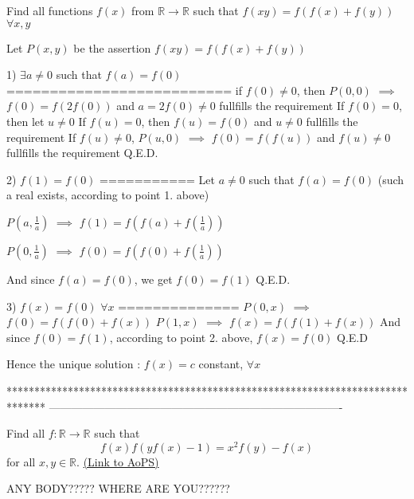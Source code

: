 \begin{solution}
	\begin{tcolorbox}Find all functions $ f(x)$ from $ \mathbb R\to\mathbb R$ such that $ f(xy)=f(f(x)+f(y))$ $ \forall x,y$\end{tcolorbox}

Let $ P(x,y)$ be the assertion $ f(xy)=f(f(x)+f(y))$

1) $ \exists a\ne 0$ such that $ f(a)=f(0)$
==========================
if $ f(0)\ne 0$, then $ P(0,0)$ $ \implies$ $ f(0)=f(2f(0))$ and $ a=2f(0)\ne 0$ fullfills the requirement
If $ f(0)=0$, then let $ u\ne 0$
If $ f(u)=0$, then $ f(u)=f(0)$ and $ u\ne 0$ fullfills the requirement
If $ f(u)\ne 0$, $ P(u,0)$ $ \implies$ $ f(0)=f(f(u))$ and $ f(u)\ne 0$ fullfills the requirement
Q.E.D.

2) $ f(1)=f(0)$
===========
Let $ a\ne 0$ such that $ f(a)=f(0)$ (such a real exists, according to point 1. above)

$ P(a,\frac 1a)$ $ \implies$ $ f(1)=f(f(a)+f(\frac 1a))$

$ P(0,\frac 1a)$ $ \implies$ $ f(0)=f(f(0)+f(\frac 1a))$

And since $ f(a)=f(0)$, we get $ f(0)=f(1)$
Q.E.D.

3) $ f(x)=f(0)$ $ \forall x$
==============
$ P(0,x)$ $ \implies$ $ f(0)=f(f(0)+f(x))$
$ P(1,x)$ $ \implies$ $ f(x)=f(f(1)+f(x))$
And since $ f(0)=f(1)$, according to point 2. above, $ f(x)=f(0)$
Q.E.D

Hence the unique solution : $ \boxed{f(x)=c}$ constant, $ \forall x$
\end{solution}
*******************************************************************************
-------------------------------------------------------------------------------

\begin{problem}
	Find all $ f: \mathbb R\to\mathbb R$ such that \[ f(x)f(yf(x)-1)=x^2f(y)-f(x)\] for all $x,y\in\mathbb R$.
	\flushright \href{https://artofproblemsolving.com/community/c6h316347}{(Link to AoPS)}
\end{problem}



\begin{solution}
	ANY BODY????? WHERE ARE YOU??????
\end{solution}




